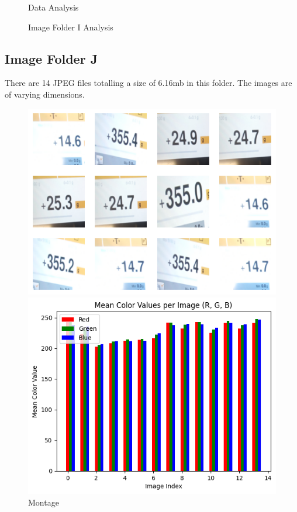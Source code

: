 \begin{figure}[ht]
\begin{minipage}[t]{0.50\textwidth}
        \caption*{Data Analysis}
    \end{minipage}
    \caption{Image Folder I Analysis}
    \label{fig:Image Folder I Analysis}
\end{figure}

\subsection{Image Folder J}

There are 14 JPEG files totalling a size of 6.16mb in this folder. The images are of varying dimensions.

\begin{figure}[ht]
    \centering
    \begin{minipage}[t]{0.25\textwidth}
        \centering
        \includegraphics[width=\textwidth]{Figures/EDA_Charts/11/montage.png}
        \caption*{Montage}
    \end{minipage}\hfill
    \begin{minipage}[t]{0.25\textwidth}
        \centering
        \includegraphics[width=\textwidth]{Figures/EDA_Charts/11/rgb.png}

\end{minipage}
\end{figure}
